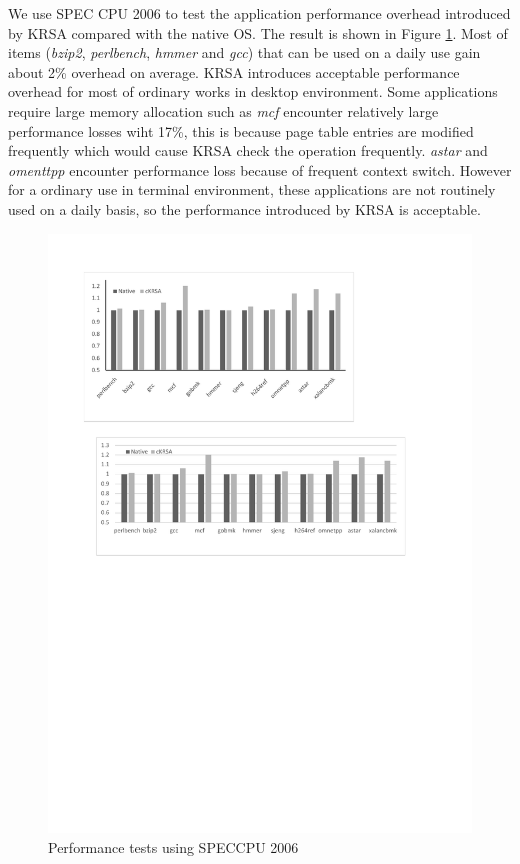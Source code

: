 \documentclass[conference]{IEEEtran}
\begin{document}
We use SPEC CPU 2006 to test the application performance overhead introduced by KRSA compared with the native OS. The result is shown in Figure \ref{spec}. 
Most of items (\textit{bzip2}, \textit{perlbench}, \textit{hmmer} and \textit{gcc}) that can be used on a daily use gain about 2\% overhead on average. KRSA introduces acceptable performance overhead for most of ordinary works in desktop environment. Some applications require large memory allocation such as \textit{mcf} encounter relatively large performance losses wiht 17\%, this is because page table entries are modified frequently which would cause KRSA check the operation frequently. \textit{astar} and \textit{omenttpp} encounter performance loss because of frequent context switch. However for a ordinary use in terminal environment, these applications are not routinely used on a daily basis, so the performance introduced by KRSA is acceptable.  

\begin{figure}
    \centering
    \includegraphics[scale=0.5]{pic/spec_1.pdf}
    \caption{Performance tests using SPECCPU 2006}
    \label{spec}
\end{figure}
\end{document}
